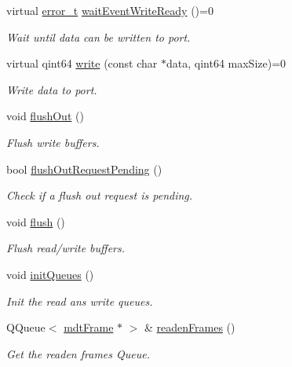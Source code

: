 \begin{DoxyCompactItemize}
virtual \hyperlink{classmdt_abstract_port_ad4121bb930c95887e77f8bafa065a85e}{error\-\_\-t} \hyperlink{classmdt_abstract_port_a35e4686f50e2c53c7e3618cf2c485d92}{wait\-Event\-Write\-Ready} ()=0
\begin{DoxyCompactList}\small\item\em Wait until data can be written to port. \end{DoxyCompactList}\item 
virtual qint64 \hyperlink{classmdt_abstract_port_a64d4802975a76474b9196c91f57a6d90}{write} (const char $\ast$data, qint64 max\-Size)=0
\begin{DoxyCompactList}\small\item\em Write data to port. \end{DoxyCompactList}\item 
void \hyperlink{classmdt_abstract_port_ad199c6310801893f1f7de2a2391606fc}{flush\-Out} ()
\begin{DoxyCompactList}\small\item\em Flush write buffers. \end{DoxyCompactList}\item 
bool \hyperlink{classmdt_abstract_port_a2cc79d9288bebafaa183753dcf0807f3}{flush\-Out\-Request\-Pending} ()
\begin{DoxyCompactList}\small\item\em Check if a flush out request is pending. \end{DoxyCompactList}\item 
void \hyperlink{classmdt_abstract_port_abde440c49b95833f821e1333c40a7398}{flush} ()
\begin{DoxyCompactList}\small\item\em Flush read/write buffers. \end{DoxyCompactList}\item 
void \hyperlink{classmdt_abstract_port_adf06d095d6c3e6ce939a3998bcf8b829}{init\-Queues} ()
\begin{DoxyCompactList}\small\item\em Init the read ans write queues. \end{DoxyCompactList}\item 
Q\-Queue$<$ \hyperlink{classmdt_frame}{mdt\-Frame} $\ast$ $>$ \& \hyperlink{classmdt_abstract_port_a05356a33dc546a11d2794a0419d749e0}{readen\-Frames} ()
\begin{DoxyCompactList}\small\item\em Get the readen frames Queue. \end{DoxyCompactList}\item 

\end{DoxyCompactItemize}
